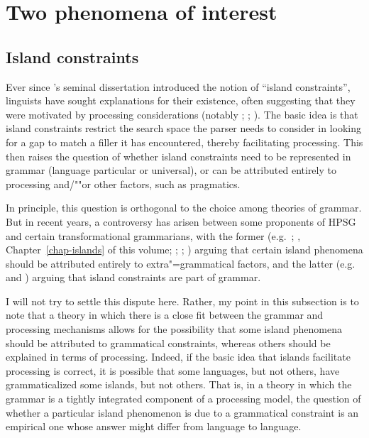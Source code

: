 \documentclass[output=paper
 	        ,biblatex
                ,babelshorthands
                ,newtxmath
                ,draftmode
                ,colorlinks, citecolor=brown
]{langscibook}
\begin{document}
\section{Two phenomena of interest}
\label{sec-phenomena-processing}

\subsection{Island constraints}

\largerpage
Ever since \citeauthor{Ross67}'s seminal dissertation \citeyearpar{Ross67} introduced the notion of
``island constraints'', linguists have sought explanations for their existence, often
suggesting that they were motivated by processing considerations (notably \citealt{Grosu72-u};
\citealt{Fodor83}; \citealt{Deane91}).  The basic idea is that island constraints restrict the
search space the parser needs to consider in looking for a gap to match a filler it has encountered,
thereby facilitating processing.  This then raises the question of whether island constraints need
to be represented in grammar (language particular or universal), or can be attributed entirely to
processing and/""or other factors, such as pragmatics.

In principle, this question is orthogonal to the choice among theories of grammar.  But in recent
years, a controversy has arisen between some proponents of HPSG and certain transformational
grammarians, with the former (e.g.\ \citealp{Chaves2012}; \citeyear{chapters/islands}, Chapter~\ref{chap-islands} of this volume; \citealt{HofmeisterSag2010};
\citealt*{HofmeisterEtal2013}; ) arguing that certain island phenomena should be attributed entirely
to extra"=grammatical factors, and the latter (e.g.\ \citealt{Phillips2013} and
\citealt{SWP2012a-u}) arguing that island constraints are part of grammar. 

I will not try to settle this dispute here.  Rather, my point in this subsection is to note that a
theory in which there is a close fit between the grammar and processing mechanisms allows for the
possibility that some island phenomena should be attributed to grammatical constraints, whereas
others should be explained in terms of processing.  Indeed, if the basic idea that islands
facilitate processing is correct, it is possible that some languages, but not others, have
grammaticalized some islands, but not others.  That is, in a theory in which the grammar is a
tightly integrated component of a processing model, the question of whether a particular island
phenomenon is due to a grammatical constraint is an empirical one whose answer might differ from
language to language.  
\end{document}
